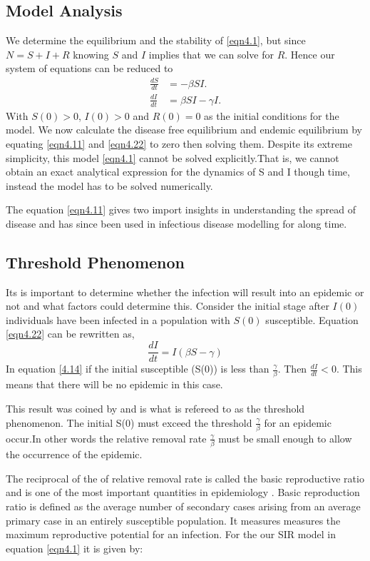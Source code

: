 \subsection{Model Analysis}
We determine the equilibrium and the stability of \ref{eqn4.1}, but since $N =S + I + R$ knowing $S$ and $I$ implies that we can solve for  $R$. Hence our system of equations can be reduced to 
\begin{align}
\frac{dS}{dt} &=-\beta SI. \label{eqn4.11} \\
 \frac{dI}{dt} &= \beta S I - \gamma  I \label{eqn4.22}.
\end{align}
 With $S(0) >0$, $I(0) > 0$ and $R(0) =0$ as the initial conditions for the model.
 We now calculate the disease free equilibrium and endemic equilibrium by equating \ref{eqn4.11} and \ref{eqn4.22} to zero then solving them. Despite its extreme simplicity, this model \ref{eqn4.1} cannot be solved explicitly.That is, we cannot obtain an exact analytical expression for the dynamics of S and I
though time, instead the model has to be solved numerically.

The equation \ref{eqn4.11} gives two import insights in understanding the spread of disease and has since been used in infectious disease modelling for along time.

\subsection{Threshold Phenomenon} 
Its is important to determine whether the infection will result into an epidemic or not and what factors could determine this. Consider the initial stage after $I(0)$ individuals have been infected in a population with $S(0)$ susceptible. Equation \ref{eqn4.22} can be rewritten as,
\begin{equation} 
\frac{dI}{dt} = I \left(\beta S -\gamma \right)\label{4.14}
\end{equation}
In equation \ref{4.14} if the initial susceptible (S(0)) is less than $\frac{\gamma}{\beta}$. Then $\frac{dI}{dt} < 0.$ This means that there will be no epidemic in this case.

This result was coined by \cite{m1925applications} and  is what is refereed to as the threshold phenomenon. The initial S(0) must exceed the threshold $\frac{\gamma}{\beta}$ for an epidemic occur.In  other words the relative removal rate $\frac{\gamma}{\beta}$ must be small enough to allow the occurrence  of the epidemic.
 
 The reciprocal of the of relative removal rate is called the basic reproductive ratio and is one of the most important quantities in epidemiology . Basic reproduction ratio is defined as the average number of secondary cases arising from an average primary case in an entirely susceptible population. It measures measures the maximum reproductive potential for an infection. For the our SIR model in equation \ref{eqn4.1} it is given by:

